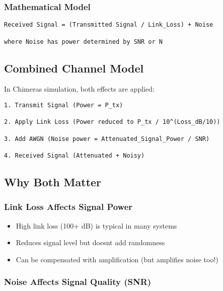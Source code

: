 \subsubsection{Mathematical Model}\label{mathematical-model-1}

\begin{verbatim}
Received Signal = (Transmitted Signal / Link_Loss) + Noise

where Noise has power determined by SNR or N
\end{verbatim}

\subsection{Combined Channel Model}\label{combined-channel-model}

In Chimera\textquotesingle s simulation, both effects are applied:

\begin{verbatim}
1. Transmit Signal (Power = P_tx)
        
2. Apply Link Loss (Power reduced to P_tx / 10^(Loss_dB/10))
        
3. Add AWGN (Noise power = Attenuated_Signal_Power / SNR)
        
4. Received Signal (Attenuated + Noisy)
\end{verbatim}

\subsection{Why Both Matter}\label{why-both-matter}

\subsubsection{Link Loss Affects Signal
Power}\label{link-loss-affects-signal-power}

\begin{itemize}
\tightlist
\item
  High link loss (100+ dB) is typical in many systems
\item
  Reduces signal level but doesn\textquotesingle t add randomness
\item
  Can be compensated with amplification (but amplifies noise too!)
\end{itemize}

\subsubsection{Noise Affects Signal Quality
(SNR)}\label{noise-affects-signal-quality-snr}

